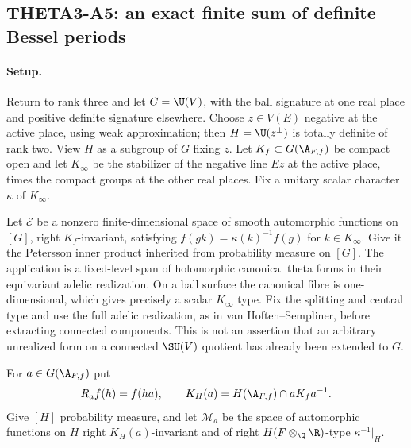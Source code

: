 \subsection{THETA3-A5: an exact finite sum of definite Bessel periods}\label{A5}

\paragraph{Setup.}
Return to rank three and let $G=\U(V)$, with the ball signature at one
real place and positive definite signature elsewhere. Choose
$z\in V(E)$ negative at the active place, using weak approximation;
then $H=\U(z^\perp)$ is totally definite of rank two. View $H$ as a
subgroup of $G$ fixing $z$. Let $K_f\subset G(\A_{F,f})$ be compact
open and let $K_\infty$ be the stabilizer of the negative line $Ez$ at
the active place, times the compact groups at the other real places.
Fix a unitary scalar character $\kappa$ of $K_\infty$.

Let $\mathcal E$ be a nonzero finite-dimensional space of smooth
automorphic functions on $[G]$, right $K_f$-invariant, satisfying
$f(gk)=\kappa(k)^{-1}f(g)$ for $k\in K_\infty$. Give it the
Petersson inner product inherited from probability measure on $[G]$.
The application is a fixed-level span of holomorphic canonical theta
forms in their equivariant adelic realization. On a ball surface the
canonical fibre is one-dimensional, which gives precisely a scalar
$K_\infty$ type. Fix the splitting and central type and use the full
adelic realization, as in van Hoften--Sempliner, before extracting
connected components. This is not an assertion that an arbitrary
unrealized form on a connected $\SU(V)$ quotient has already been
extended to $G$.

For $a\in G(\A_{F,f})$ put
\[
 R_af(h)=f(ha),\qquad
 K_H(a)=H(\A_{F,f})\cap aK_fa^{-1}.
\]
Give $[H]$ probability measure, and let $\mathcal M_a$ be the space of
automorphic functions on $H$ right $K_H(a)$-invariant and of right
$H(F\otimes_\Q\R)$-type $\kappa^{-1}|_H$.

